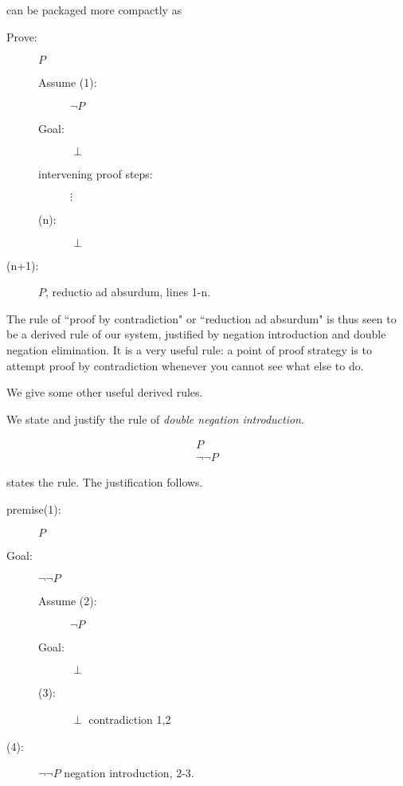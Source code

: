 \documentclass[12pt]{article}
\begin{document}
can be packaged more compactly as 


\begin{description}

\item[Prove:]  $P$

\begin{description}

\item[Assume (1):]  $\neg P$

\item[Goal:]  $\perp$

\item[intervening proof steps:]  $\vdots$

\item[(n):]  $\perp$



\end{description}

\item[(n+1):]  $P$, reductio ad absurdum, lines 1-n.


\end{description}

The rule of ``proof by contradiction" or ``reduction ad absurdum" is thus seen to be a derived rule of our system, justified by negation introduction and double negation elimination.  It is a very useful rule:  a point of proof strategy is to attempt proof by contradiction whenever you cannot see what else to do.

We give some other useful derived rules.

We state and justify the rule of {\em double negation introduction\/}.

$$\begin{array}{c}

P \\ \hline

\neg \neg P

\end{array}$$

states the rule.  The justification follows.

\begin{description}

\item[premise(1):]  $P$

\item[Goal:]  $\neg\neg P$

\begin{description}

\item[Assume (2):]  $\neg P$

\item[Goal:]  $\perp$

\item[(3):]  $\perp$ contradiction 1,2


\end{description}

\item[(4):]  $\neg \neg P$ negation introduction, 2-3.

\end{description}
\end{document}
